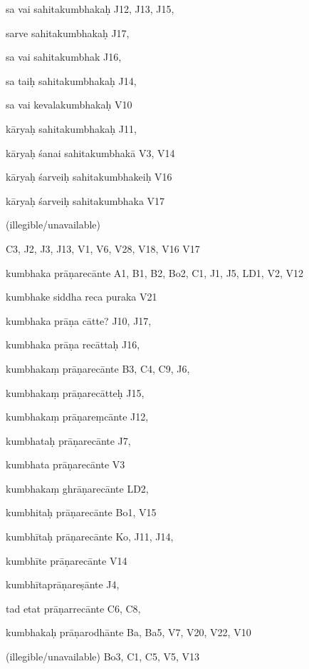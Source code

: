 \begin{ekdosis}
\begin{marma}[hp01_055]
\begin{marma}[hp02_009]
\begin{marma}[hp02_011]
\begin{marma}[hp02_73a]
\begin{description}
        \end{description}
\end{marma}


\begin{marma}[hp02_73b]
\item[sa vai sahitakumbhakaḥ] J12, J13, J15, 
\item[sarve sahitakumbhakaḥ] J17,
\item[sa vai sahitakumbhak] J16, 
\item[sa taiḥ sahitakumbhakaḥ] J14,
\item[sa vai kevalakumbhakaḥ] V10
\item[kāryaḥ sahitakumbhakaḥ] J11,
\item[kāryaḥ śanai sahitakumbhakā] V3, V14
\item[kāryaḥ śarveiḥ sahitakumbhakeiḥ] V16
\item[kāryaḥ śarveiḥ sahitakumbhaka] V17
\item[(illegible/unavailable)]
 \begin{description}

        \end{description}
\end{marma}


\begin{marma}[hp02_78a]
 C3, J2, J3, J13, V1, V6, V28, V18, V16
 V17
\item[kumbhaka prāṇarecānte] A1, B1, B2, Bo2, C1, J1, J5, LD1, V2, V12
\item[kumbhake siddha reca puraka] V21
\item[kumbhaka prāṇa cātte?] J10, J17, 
\item[kumbhaka prāṇa recāttaḥ] J16,
\item[kumbhakaṃ prāṇarecānte] B3, C4, C9, J6, 
\item[kumbhakaṃ prāṇarecātteḥ] J15,
\item[kumbhakaṃ prāṇareṃcānte] J12,
\item[kumbhataḥ prāṇarecānte] J7,
\item[kumbhata prāṇarecānte] V3
\item[kumbhakaṃ ghrāṇarecānte] LD2, 
\item[kumbhitaḥ prāṇarecānte] Bo1, V15
\item[kumbhītaḥ prāṇarecānte] Ko, J11, J14, 
\item[kumbhīte prāṇarecānte] V14
\item[kumbhītaprāṇareṣānte] J4,
\item[tad etat prāṇarrecānte] C6, C8, 
\item[kumbhakaḥ prāṇarodhānte] Ba, Ba5, V7, V20, V22, V10
\item[(illegible/unavailable)] Bo3, C1, C5, V5, V13
 \begin{description}

        \end{description}
\end{marma}


\end{ekdosis}


